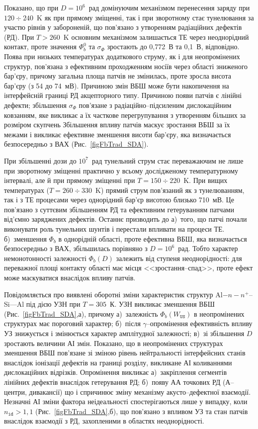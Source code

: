 Показано, що при $D=10^6$~рад домінуючим механізмом перенесення заряду при $120\div240$~K як при прямому зміщенні, так і при зворотному стає тунелювання за участю рівнів у забороненій, що пов'язано з утворенням радіаційних дефектів (РД).
При $T>260$~K основним механізмом залишається ТЕ через неоднорідний контакт, проте значення $\Phi_b^0$ та $\sigma_{\Phi}$
зростають до 0,772~В та 0,1~В, відповідно.
Поява при низьких температурах додаткового струму, як і для неопромінених структур, пов'язана з ефективним проходженням носіїв через області зниженого бар'єру,
причому загальна площа патчів не змінилась, проте зросла висота бар'єру (з 54 до 74~мВ).
Причиною змін ВБШ може бути накопичення на інтерфейсній границі РД акцепторного типу.
Причиною появи патчів є лінійні дефекти; збільшення $\sigma_{\Phi}$ пов'язане з  радіаційно--підсиленим дислокаційним ковзанням,
яке викликає а їх часткове перегрупування з утворенням більших за розміром скупчень
Збільшення впливу патчів маскує зростання ВБШ за їх межами і викликає ефективне зменшення висоти бар'єру, яка визначається безпосередньо з ВАХ (Рис.~\ref{figFbTrad_SDA}).

При збільшенні дози до $10^7$~рад тунельний струм стає переважаючим не лише при зворотному зміщенні практично у всьому дослідженому температурному інтервалі,
але й при прямому зміщенні при $T=150\div220$~K.
При вищих температурах ($T=260\div330$~K) прямий струм пов'язаний як з тунелюванням, так і з ТЕ процесами через однорідний бар'єр висотою близько 710~мВ.
Це пов'язано з суттєвим збільшенням РД та ефективним гетеруванням патчами від'ємно заряджених дефектів.
Останнє призводить до
а)~того, що патчі почали виконувати роль тунельних шунтів і перестали впливати на процеси ТЕ.
б)~зменшення $\Phi_b$ в однорідній області, проте ефективна ВБШ, яка визначається безпосередньо з ВАХ, збільшилась порівняно з  $D=10^6$~рад.
Тобто характер немонотонності залежності $\Phi_b(D)$ залежить від ступеня неоднорідності:
для переважної площі контакту області має місця <<зростання--спад>>, проте ефект може маскуватися внаслідок впливу патчів.

Повідомляється про виявлені оборотні зміни характеристик структур Al$-n-n^+$--Si---Al під дією УЗН при $T=305$~К.
УЗН викликає зменшення ВБШ (Рис.~\ref{figFbTrad_SDA},а), причому
а)~залежність $\Phi_b(W_\mathtt{US})$ в неопромінених структурах має пороговий характер;
б)~після $\gamma$--опромінення ефективність впливу УЗ знижується і змінюється характер амплітудної залежності;
в)~зі збільшення $D$ зростають величини АІ змін.
Показано, що в неопромінених структурах зменшення ВБШ пов'язане зі зміною рівень нейтральності інтерфейсних станів
внаслідок іонізації дефектів на границі розділу, викликане АІ коливаннями дислокаційних відрізків.
Опромінення викликає
а)~закріплення сегментів лінійних дефектів внаслідок гетерування РД;
б)~появу АА точкових РД (А--центри, дивакансії)
що і спричинює зміну механізму акусто--дефектної взаємодії.
Незначні АІ зміни фактора неідеальності спостерігаються лише у випадку, коли $n_\mathtt{id}>1,1$ (Рис.~\ref{figFbTrad_SDA},б),
що пов'язано з впливом УЗ та стан патчів внаслідок взаємодії з РД, захопленими в областях неоднорідності.

